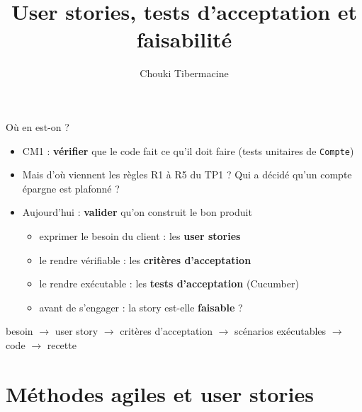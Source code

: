 \documentclass[aspectratio=169,10pt]{beamer}
\title{User stories, tests d'acceptation et faisabilité}
\author[C. Tibermacine]{Chouki Tibermacine}
\date{}
\begin{document}

\begin{frame}{Où en est-on ?}
  \begin{itemize}
    \item CM1 : \textbf{vérifier} que le code fait ce qu'il doit faire (tests unitaires de \texttt{Compte})
    \item Mais d'où viennent les règles R1 à R5 du TP1 ? Qui a décidé qu'un compte épargne est plafonné ?
    \item Aujourd'hui : \textbf{valider} qu'on construit le bon produit
      \begin{itemize}
        \item exprimer le besoin du client : les \textbf{user stories}
        \item le rendre vérifiable : les \textbf{critères d'acceptation}
        \item le rendre exécutable : les \textbf{tests d'acceptation} (Cucumber)
        \item avant de s'engager : la story est-elle \textbf{faisable} ?
      \end{itemize}
  \end{itemize}
  \vspace{3mm}
  \begin{datacard}
    \small \alert{besoin} $\rightarrow$ user story $\rightarrow$ critères d'acceptation $\rightarrow$ scénarios exécutables $\rightarrow$ code $\rightarrow$ recette
  \end{datacard}
\end{frame}

\section{Méthodes agiles et user stories}
\end{document}
